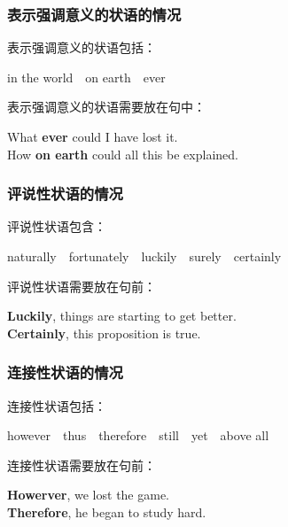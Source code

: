 \documentclass[UTF8]{ctexart}
\begin{document}
\subsubsection{表示强调意义的状语的情况}
    表示强调意义的状语包括：\vspace{-3pt}
    \begin{center}
        \ttfamily
        in the world~~on earth~~ever\\[6mm]
    \end{center}
    表示强调意义的状语需要放在句中：
    \begin{center}
        \large
        \ttfamily
        What \textbf{ever} could I have lost it.\\[3mm]
        How \textbf{on earth} could all this be explained.
    \end{center}\vspace{10pt}

\subsubsection{评说性状语的情况}
    评说性状语包含：\vspace{-3pt}
    \begin{center}
        \ttfamily
        naturally~~fortunately~~luckily~~surely~~certainly\\[6mm]
    \end{center}
    评说性状语需要放在句前：
    \begin{center}
        \large
        \ttfamily
        \textbf{Luckily}, things are starting to get better.\\[3mm]
        \textbf{Certainly}, this proposition is true.
    \end{center}\vspace{10pt}

\subsubsection{连接性状语的情况}
    连接性状语包括：\vspace{-3pt}
    \begin{center}
        \ttfamily
        however~~thus~~therefore~~still~~yet~~above all\\[6mm]
    \end{center}
    连接性状语需要放在句前：
    \begin{center}
        \large
        \ttfamily
        \textbf{Howerver}, we lost the game.\\[3mm]
        \textbf{Therefore}, he began to study hard.
    \end{center}
\end{document}

